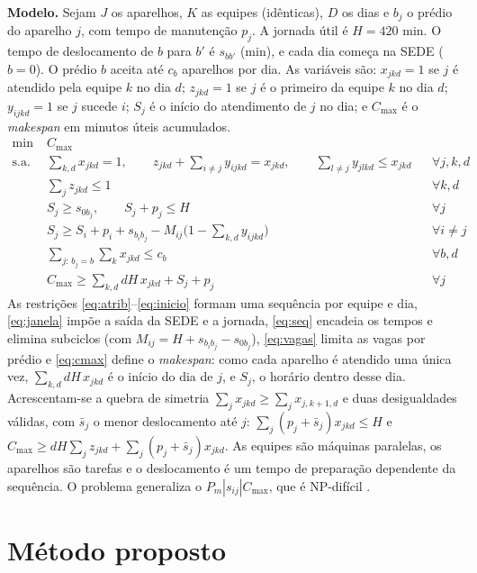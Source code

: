 \textbf{Modelo.} Sejam $J$ os aparelhos, $K$ as equipes (idênticas), $D$ os dias e $b_j$ o prédio do aparelho $j$, com tempo de manutenção $p_j$. A jornada útil é $H=420$ min. O tempo de deslocamento de $b$ para $b'$ é $s_{bb'}$ (min), e cada dia começa na SEDE ($b=0$). O prédio $b$ aceita até $c_b$ aparelhos por dia. As variáveis são: $x_{jkd}=1$ se $j$ é atendido pela equipe $k$ no dia $d$; $z_{jkd}=1$ se $j$ é o primeiro da equipe $k$ no dia $d$; $y_{ijkd}=1$ se $j$ sucede $i$; $S_j$ é o início do atendimento de $j$ no dia; e $C_{\max}$ é o \textit{makespan} em minutos úteis acumulados.
\begin{align}
\min\; & C_{\max} \nonumber\\
\text{s.a.}\; & \textstyle\sum_{k,d} x_{jkd} = 1, \qquad z_{jkd} + \sum_{i\neq j} y_{ijkd} = x_{jkd}, \qquad \sum_{l\neq j} y_{jlkd} \le x_{jkd} && \forall j,k,d \label{eq:atrib}\\
& \textstyle\sum_{j} z_{jkd} \le 1 && \forall k,d \label{eq:inicio}\\
& S_j \ge s_{0b_j}, \qquad S_j + p_j \le H && \forall j \label{eq:janela}\\
& \textstyle S_j \ge S_i + p_i + s_{b_ib_j} - M_{ij}\bigl(1-\sum_{k,d} y_{ijkd}\bigr) && \forall i\neq j \label{eq:seq}\\
& \textstyle\sum_{j:\,b_j=b}\sum_k x_{jkd} \le c_b && \forall b,d \label{eq:vagas}\\
& \textstyle C_{\max} \ge \sum_{k,d} dH\,x_{jkd} + S_j + p_j && \forall j \label{eq:cmax}
\end{align}
As restrições \eqref{eq:atrib}--\eqref{eq:inicio} formam uma sequência por equipe e dia, \eqref{eq:janela} impõe a saída da SEDE e a jornada, \eqref{eq:seq} encadeia os tempos e elimina subciclos (com $M_{ij}=H+s_{b_ib_j}-s_{0b_j}$), \eqref{eq:vagas} limita as vagas por prédio e \eqref{eq:cmax} define o \textit{makespan}: como cada aparelho é atendido uma única vez, $\sum_{k,d} dH\,x_{jkd}$ é o início do dia de $j$, e $S_j$, o horário dentro desse dia. Acrescentam-se a quebra de simetria $\sum_j x_{jkd}\ge\sum_j x_{j,k+1,d}$ e duas desigualdades válidas, com $\bar s_j$ o menor deslocamento até $j$: $\sum_j (p_j+\bar s_j)x_{jkd}\le H$ e $C_{\max}\ge dH\sum_j z_{jkd}+\sum_j(p_j+\bar s_j)x_{jkd}$. As equipes são máquinas paralelas, os aparelhos são tarefas e o deslocamento é um tempo de preparação dependente da sequência. O problema generaliza o $P_m|s_{ij}|C_{\max}$, que é NP-difícil \cite{allahverdi2015third,vallada2011genetic}.

\section{Método proposto}

